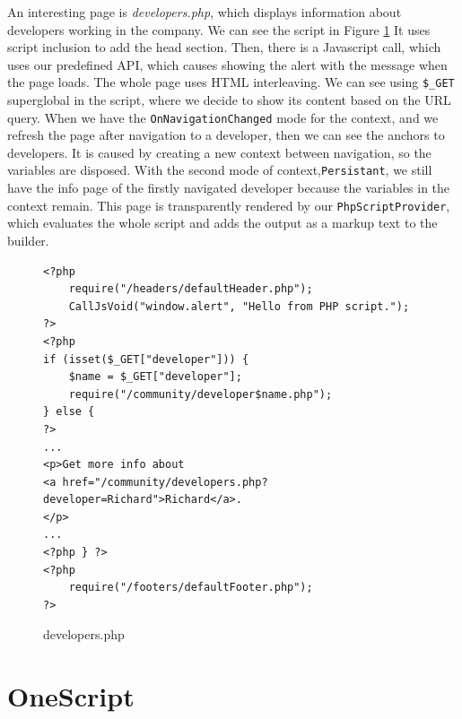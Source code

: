 \par
An interesting page is \textit{developers.php}, which displays information about developers working in the company.
We can see the script in Figure \ref{img25:developer}
It uses script inclusion to add the head section.
Then, there is a Javascript call, which uses our predefined API, which causes showing the alert with the message when the page loads.
The whole page uses HTML interleaving.
We can see using \texttt{\$\_GET} superglobal in the script, where we decide to show its content based on the URL query.
When we have the \texttt{OnNavigationChanged} mode for the context, and we refresh the page after navigation to a developer, then we can see the anchors to developers.
It is caused by creating a new context between navigation, so the variables are disposed.
With the second mode of context,\texttt{Persistant}, we still have the info page of the firstly navigated developer because the variables in the context remain.
This page is transparently rendered by our \texttt{PhpScriptProvider}, which evaluates the whole script and adds the output as a markup text to the builder.
\par
\begin{figure}
\begin{lstlisting}
<?php
    require("/headers/defaultHeader.php");
    CallJsVoid("window.alert", "Hello from PHP script.");
?>
<?php
if (isset($_GET["developer"])) { 
    $name = $_GET["developer"];
    require("/community/developer$name.php");
} else {
?>
...
<p>Get more info about 
<a href="/community/developers.php?developer=Richard">Richard</a>.
</p>
...
<?php } ?>
<?php
    require("/footers/defaultFooter.php");
?>
\end{lstlisting}
\caption{developers.php}
\label{img25:developer}
\end{figure}

\section{OneScript}

